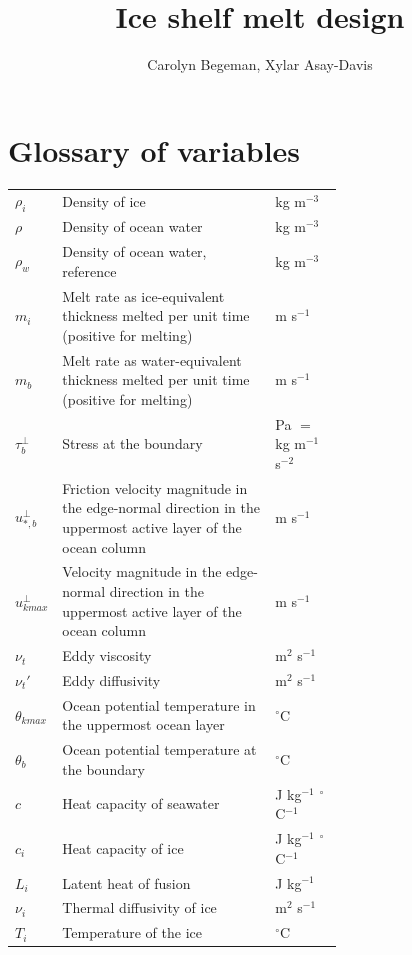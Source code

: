 \documentclass[11pt]{report}
\begin{document}
\title{Ice shelf melt design}
\author{Carolyn Begeman, Xylar Asay-Davis}

\maketitle

\section{Glossary of variables}

\begin{tabularx}{\linewidth}{l|p{0.65\linewidth}|X}
    $\rho_i$ & Density of ice & kg m$^{-3}$ \\
    $\rho$ & Density of ocean water & kg m$^{-3}$\\
    $\rho_w$ & Density of ocean water, reference & kg m$^{-3}$\\
    $m_i$ & Melt rate as ice-equivalent thickness melted per unit time (positive for melting) & m s$^{-1}$\\
    $m_b$ & Melt rate as water-equivalent thickness melted per unit time (positive for melting) & m s$^{-1}$\\
    $\tau_b^\perp$ & Stress at the boundary & Pa $=$ kg m$^{-1}$ s$^{-2}$\\
    $u_{*,b}^\perp$ & Friction velocity magnitude in the edge-normal direction in the uppermost active layer of the ocean column & m s$^{-1}$\\
    $u_{kmax}^\perp$ & Velocity magnitude in the edge-normal direction in the uppermost active layer of the ocean column & m s$^{-1}$\\
    $\nu_t$ & Eddy viscosity & m$^2$ s$^{-1}$\\
    $\nu_t'$ & Eddy diffusivity & m$^2$ s$^{-1}$\\
    $\theta_{kmax}$ & Ocean potential temperature in the uppermost ocean layer & $^\circ$C\\
    $\theta_b$ & Ocean potential temperature at the boundary & $^\circ$C\\
    $c$ & Heat capacity of seawater & J kg$^{-1}$ $^\circ$C$^{-1}$\\
    $c_i$ & Heat capacity of ice & J kg$^{-1}$ $^\circ$C$^{-1}$\\
    $L_i$ & Latent heat of fusion & J kg$^{-1}$\\
    $\nu_i$ & Thermal diffusivity of ice & m$^2$ s$^{-1}$\\
    $T_i$ & Temperature of the ice & $^{\circ}$C\\

\end{tabularx}
\end{document}
